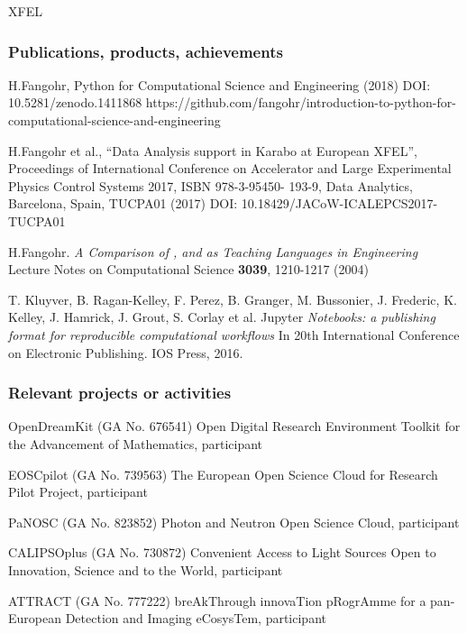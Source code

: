 \begin{sitedescription}{XFEL}
\subsubsection*{Publications, products, achievements}

\begin{compactenum}
\item H.Fangohr, Python for Computational Science and Engineering
  (2018) DOI: 10.5281/zenodo.1411868 \newline
  https://github.com/fangohr/introduction-to-python-for-computational-science-and-engineering
\item H.Fangohr et al., “Data Analysis support in Karabo at European
  XFEL”, Proceedings of International Conference on Accelerator and
  Large Experimental Physics Control Systems 2017, ISBN 978-3-95450-
  193-9, Data Analytics, Barcelona, Spain, TUCPA01 (2017) DOI: 10.18429/JACoW-ICALEPCS2017-TUCPA01
\item H.Fangohr.
\emph{A Comparison of , \Matlab and \Python as Teaching Languages in Engineering}
Lecture Notes on Computational Science \textbf{3039}, 1210-1217 (2004)
\item T. Kluyver, B. Ragan-Kelley, F. Perez, B. Granger, M. Bussonier, J. Frederic, K. Kelley, J. Hamrick, J. Grout, S. Corlay et al. Jupyter
\emph{Notebooks: a publishing format for reproducible computational workflows} In 20th International Conference on Electronic Publishing. IOS Press, 2016.
\end{compactenum}

\subsubsection*{Relevant projects or activities}

\begin{compactenum}
\item OpenDreamKit (GA No. 676541) Open Digital Research Environment
  Toolkit for the Advancement of Mathematics, participant
\item EOSCpilot (GA No. 739563) The European Open Science Cloud for
  Research Pilot Project, participant
\item PaNOSC (GA No. 823852) Photon and Neutron Open Science Cloud,
  participant
\item CALIPSOplus (GA No. 730872) Convenient Access to Light Sources
  Open to Innovation, Science and to the World, participant
\item ATTRACT (GA No. 777222) breAkThrough innovaTion pRogrAmme for a
  pan-European Detection and Imaging eCosysTem, participant

\end{compactenum}




\end{sitedescription}



